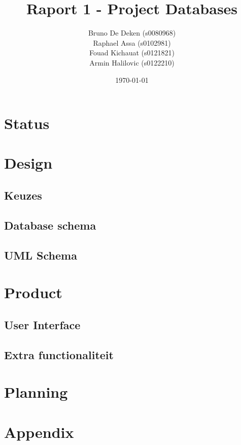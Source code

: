 \documentclass[12pt]{article}
\title{Raport 1 - Project Databases}
\author{
    Bruno De Deken (s0080968) \\
    Raphael Assa (s0102981) \\
    Fouad Kichauat (s0121821) \\
    Armin Halilovic (s0122210)
}
\date{\today}
\begin{document}
\maketitle
\clearpage

\tableofcontents
\clearpage

\section{Status}

\clearpage

\section{Design}
\subsection{Keuzes}

\subsection{Database schema}

\subsection{UML Schema}

\clearpage

\section{Product}
\subsection{User Interface}

\subsection{Extra functionaliteit}

\clearpage

\section{Planning}

\clearpage

\section{Appendix}

\clearpage
\end{document}
